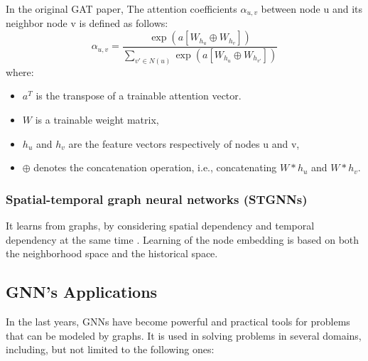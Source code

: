 In the original GAT paper,  The attention coefficients $\alpha_{u,v}$ between node u and its neighbor node v is defined as follows:
\begin{equation}
\alpha_{u,v} = \frac{\exp(a   [W_{h_u} \oplus W_{h_v}])}{\sum_{v' \in N(u)} \exp(a   [W_{h_u} \oplus W_{h_{v'}}])}
\end{equation}
where:
\begin{itemize}
    \item $a^T$ is the transpose of a trainable attention vector.
    \item $W$ is a trainable weight matrix,
    \item $h_u$ and $h_v$ are the feature vectors respectively of nodes u and v,
    \item $\oplus$ denotes the concatenation operation, i.e., concatenating $W*h_u$ and $W*h_v$.
\end{itemize}



\subsubsection{Spatial-temporal graph neural networks (STGNNs)}
It learns from graphs, by considering spatial dependency and temporal dependency at the same time \cite{jiang}. Learning of the node embedding is based on both the neighborhood space and the historical space.

\subsection{GNN's Applications}
 In the last years, GNNs have become powerful and practical tools for problems that can be modeled by graphs. It is used in solving problems in several domains, including, but not limited to the following ones:


